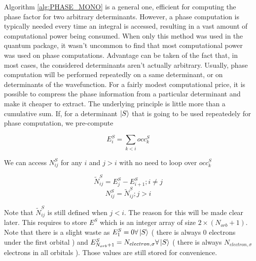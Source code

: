 Algorithm \ref{alg:PHASE_MONO} is a general one, efficient for computing the phase factor for two arbitrary determinants. However, a phase computation is typically needed every time an integral is accessed, resulting in a vast amount of computational power being consumed. When only this method was used in the quantum package, it wasn't uncommon to find that most computational power was used on phase computations.
Advantage can be taken of the fact that, in most cases, the considered determinants aren't actually arbitrary. Usually, phase computation will be performed repeatedly on a same determinant, or on determinants of the wavefunction. For a fairly modest computational price, it is possible to compress the phase information from a particular determinant and make it cheaper to extract. The underlying principle is little more than a cumulative sum. If, for a determinant $\ket S$ that is going to be used repeatedely for phase computation, we pre-compute
        
$$E^S_{i} = \sum_{k < i} occ^{S}_{k}$$
        
We can access $N^S_{ij}$ for any $i$ and $j>i$ with no need to loop over $occ^{S}_{k}$

$$\tilde N^S_{ij} = E^S_j - E^S_{i+1} ; i \neq j$$
$$N^S_{ij} = \tilde N^S_{ij} ; j>i$$

Note that $\tilde N^S_{ij}$ is still defined when $j<i$. The reason for this will be made clear later.
This requires to store $E^S$ which is an integer array of size $2 \times (N_{orb}+1)$. Note that there is a slight waste as $E^S_1 = 0 \forall \ket S$ ( there is always $0$ electrons under the first orbital ) and $E^S_{N_{orb}+1} = N_{electron,\sigma} \forall \ket S$ ( there is always $N_{electron,\sigma}$ electrons in all orbitals ). Those values are still stored for convenience.


